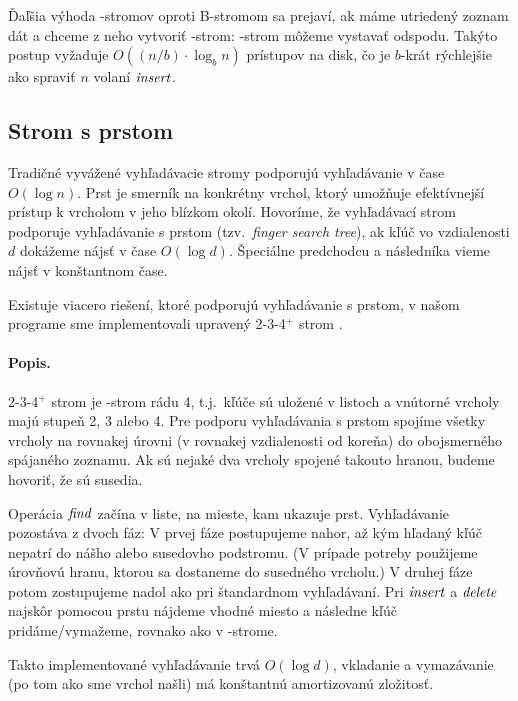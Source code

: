 Ďaľšia výhoda \Bp-stromov oproti B-stromom sa prejaví, ak máme utriedený zoznam dát a chceme z neho vytvoriť \Bp-strom:
\Bp-strom môžeme vystavať odspodu. Takýto postup vyžaduje $O((n/b)\cdot\log_b n)$ prístupov na disk,
čo je $b$-krát rýchlejšie ako spraviť $n$ volaní $\mathop{\mathit{insert}}$.




\subsection{Strom s prstom}
Tradičné vyvážené vyhľadávacie stromy podporujú vyhľadávanie v čase $O(\log n)$.
Prst je smerník na konkrétny vrchol, ktorý umožňuje efektívnejší prístup k vrcholom
v jeho blízkom okolí. Hovoríme, že vyhľadávací strom podporuje vyhľadávanie s prstom
(tzv.\ \emph{finger search tree}), ak kľúč vo vzdialenosti $d$ dokážeme nájsť v čase $O(\log d)$.
Špeciálne predchodcu a následníka vieme nájsť v konštantnom čase.

Existuje viacero riešení, ktoré podporujú vyhľadávanie s prstom, v našom programe
sme implementovali upravený 2-3-4$^+$ strom \citep{finger}.

\paragraph{Popis.}
2-3-4$^+$ strom je \Bp-strom rádu 4, t.j.\ kľúče sú uložené v listoch a vnútorné vrcholy
majú stupeň 2, 3 alebo 4. Pre podporu vyhľadávania s prstom spojíme všetky vrcholy
na rovnakej úrovni (v rovnakej vzdialenosti od koreňa) do obojsmerného spájaného zoznamu.
Ak sú nejaké dva vrcholy spojené takouto hranou, budeme hovoriť, že sú susedia.


Operácia $\mathop{\mathit{find}}$ začína v liste, na mieste, kam ukazuje prst. Vyhľadávanie pozostáva z dvoch
fáz: V prvej fáze postupujeme nahor, až kým hľadaný kľúč nepatrí do nášho alebo susedovho podstromu.
(V prípade potreby použijeme úrovňovú hranu, ktorou sa dostaneme do susedného vrcholu.)
V druhej fáze potom zostupujeme nadol ako pri štandardnom vyhľadávaní.
Pri $\mathop{\mathit{insert}}$ a $\mathop{\mathit{delete}}$ najskôr pomocou prstu nájdeme vhodné miesto a následne kľúč pridáme/vymažeme,
rovnako ako v \Bp-strome. 

Takto implementované vyhľadávanie trvá $O(\log d)$, vkladanie a vymazávanie (po tom ako sme vrchol
našli) má konštantnú amortizovanú zložitosť.


